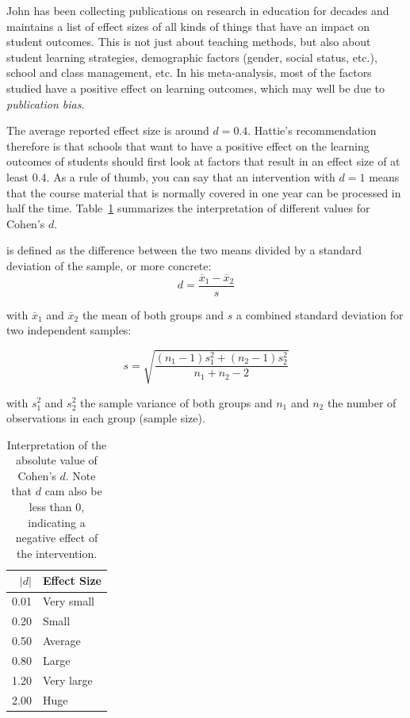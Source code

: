 John \textcite{Hattie2012} has been collecting publications on research in education for decades and maintains a list of effect sizes of all kinds of things that have an impact on student outcomes. This is not just about teaching methods, but also about student learning strategies, demographic factors (gender, social status, etc.), school and class management, etc. In his meta-analysis, most of the factors studied have a positive effect on learning outcomes, which may well be due to \emph{publication bias}. 

The average reported effect size is around $d = 0.4$. Hattie's recommendation therefore is that schools that want to have a positive effect on the learning outcomes of students should first look at factors that result in an effect size of at least 0.4. As a rule of thumb, you can say that an intervention with $d = 1$ means that the course material that is normally covered in one year can be processed in half the time. Table~\ref{table:effect-size} summarizes the interpretation of different values for Cohen's $d$.

\begin{definition}[Cohen's $d$]
  is defined as the difference between the two means divided by a standard deviation of the sample, or more concrete:
  \begin{equation}
  d = \frac{\overline{x}_1 - \overline{x}_2}{s}
  \end{equation}
  
  with $\overline{x}_1$ and $\overline{x}_2$ the mean of both groups and $s$ a combined standard deviation for two independent samples:
  
  \begin{equation}
  s = \sqrt{\frac{(n_1 - 1) s_1^2 + (n_2 - 1) s_2^2}{n_1 + n_2 - 2}}
  \end{equation}
  
  with $s_1^2$ and $s_2^2$ the sample variance of both groups and $n_1$ and $n_2$ the number of observations in each group (sample size).
\end{definition}

\begin{table}
  \centering
  \begin{tabular}{rl}
    \toprule
    \textbf{$|d|$} & \textbf{Effect Size} \\
    \midrule
    0.01 & Very small \\
    0.20 & Small \\
    0.50 & Average \\
    0.80 & Large \\
    1.20 & Very large \\
    2.00 & Huge \\
    \bottomrule
  \end{tabular}
  \caption{Interpretation of the absolute value of Cohen's $d$. Note that $d$ cam also be less than 0, indicating a negative effect of the intervention.}
  \label{table:effect-size}
\end{table}


